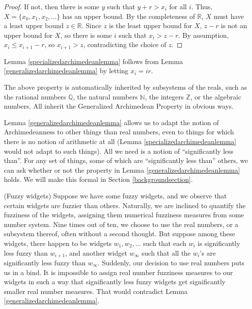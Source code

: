\documentclass[twoside,11pt]{article}
\begin{document}
\begin{proof}
If not, then there is some $y$ such that $y+r > x_i$ for all $i$.
Thus, $X=\{x_0,x_1,x_2,\ldots\}$ has an upper bound. By the completeness
of $\mathbb R$, $X$ must have a least upper bound $z\in\mathbb R$.
Since $z$ is the least upper bound for $X$, $z-r$ is not an upper bound
for $X$, so there is some $i$ such that $x_i>z-r$.
By assumption, $x_i\leq x_{i+1}-r$, so $x_{i+1}>z$, contradicting the choice
of $z$.
\end{proof}

Lemma \ref{specializedarchimedeanlemma} follows from
Lemma \ref{generalizedarchimedeanlemma} by letting $x_i=ir$.

The above property is automatically inherited by subsystems
of the reals, such as the rational numbers $\mathbb Q$, the natural
numbers $\mathbb N$, the integers $\mathbb Z$, or the algebraic numbers.
All inherit the Generalized Archimedean Property in obvious ways.

Lemma \ref{generalizedarchimedeanlemma} allows us to adapt the notion
of Archimedeanness to other things than real numbers, even to things
for which there is no notion of arithmetic at all
(Lemma \ref{specializedarchimedeanlemma} would not adapt to such things).
All we need is a notion of ``significantly less than''.
For any set of things, some of which are ``significantly less than''
others, we can ask whether or not the property in Lemma
\ref{generalizedarchimedeanlemma} holds. We will make this formal in
Section \ref{backgroundsection}.

\begin{example}
\label{fuzzywidgets}
(Fuzzy widgets)
Suppose we have some fuzzy widgets, and we observe that certain
widgets are fuzzier than others. Naturally, we are inclined to
quantify the fuzziness of the widgets, assigning them numerical
fuzziness measures from some number system. Nine times out of ten,
we choose to use the real numbers, or a subsystem thereof,
often without a second thought. But suppose
among these widgets, there happen to be widgets $w_1,w_2,\ldots$
such that each $w_{i}$ is significantly less fuzzy than $w_{i+1}$,
and another widget $w_\infty$ such that all the $w_i$'s are
significantly less fuzzy than $w_\infty$.
Suddenly, our decision to use real numbers puts us in a bind.
It is impossible to assign real number fuzziness measures to our
widgets in such a way that significantly less fuzzy widgets get
significantly smaller real number measures. That would
contradict Lemma \ref{generalizedarchimedeanlemma}.
\end{example}
\end{document}
